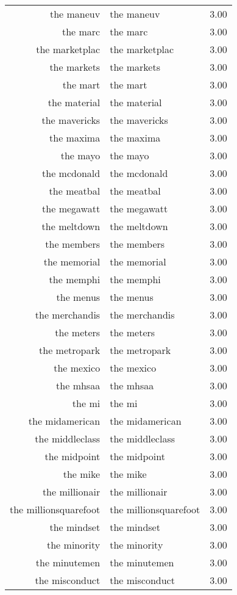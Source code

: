 \begin{table}[ht]
\begin{tabular}{rlr}
  the maneuv & the maneuv & 3.00 \\ 
  the marc & the marc & 3.00 \\ 
  the marketplac & the marketplac & 3.00 \\ 
  the markets & the markets & 3.00 \\ 
  the mart & the mart & 3.00 \\ 
  the material & the material & 3.00 \\ 
  the mavericks & the mavericks & 3.00 \\ 
  the maxima & the maxima & 3.00 \\ 
  the mayo & the mayo & 3.00 \\ 
  the mcdonald & the mcdonald & 3.00 \\ 
  the meatbal & the meatbal & 3.00 \\ 
  the megawatt & the megawatt & 3.00 \\ 
  the meltdown & the meltdown & 3.00 \\ 
  the members & the members & 3.00 \\ 
  the memorial & the memorial & 3.00 \\ 
  the memphi & the memphi & 3.00 \\ 
  the menus & the menus & 3.00 \\ 
  the merchandis & the merchandis & 3.00 \\ 
  the meters & the meters & 3.00 \\ 
  the metropark & the metropark & 3.00 \\ 
  the mexico & the mexico & 3.00 \\ 
  the mhsaa & the mhsaa & 3.00 \\ 
  the mi & the mi & 3.00 \\ 
  the midamerican & the midamerican & 3.00 \\ 
  the middleclass & the middleclass & 3.00 \\ 
  the midpoint & the midpoint & 3.00 \\ 
  the mike & the mike & 3.00 \\ 
  the millionair & the millionair & 3.00 \\ 
  the millionsquarefoot & the millionsquarefoot & 3.00 \\ 
  the mindset & the mindset & 3.00 \\ 
  the minority & the minority & 3.00 \\ 
  the minutemen & the minutemen & 3.00 \\ 
  the misconduct & the misconduct & 3.00 \\ 

\end{tabular}
\end{table}
